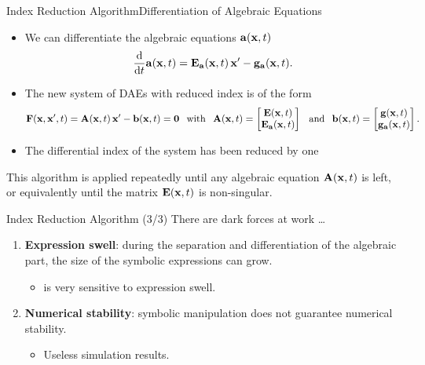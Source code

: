\begin{frame}{Index Reduction Algorithm}{Differentiation of Algebraic Equations}
  \begin{itemize}
    \item We can differentiate the algebraic equations $\mathbf{a}(\mathbf{x}, t)$
    \begin{equation*}
      \dfrac{\mathrm{d}}{\mathrm{d}t} \mathbf{a}(\mathbf{x}, t) = \mathbf{E}_{\mathbf{a}}(\mathbf{x}, t) \, \mathbf{x}^\prime - \mathbf{g}_{\mathbf{a}}(\mathbf{x}, t) \text{.}
    \end{equation*}
    \item The new system of \acp{DAE} with reduced index is of the form
    \begin{align*}
      \mathbf{F}(\mathbf{x}, \mathbf{x}^\prime, t) = \mathbf{A}(\mathbf{x}, t) \, \mathbf{x}^\prime - \mathbf{b}(\mathbf{x}, t) = \mathbf{0}
      \hspace{0.75em} \text{with} \hspace{0.75em}
      \mathbf{A}(\mathbf{x}, t) = \begin{bmatrix} \mathbf{E}(\mathbf{x}, t) \\ \mathbf{E}_{\mathbf{a}}(\mathbf{x}, t) \end{bmatrix}
      \hspace{0.75em} \text{and} \hspace{0.75em}
      \mathbf{b}(\mathbf{x}, t) = \begin{bmatrix} \mathbf{g}(\mathbf{x}, t) \\ \mathbf{g}_{\mathbf{a}}(\mathbf{x}, t) \end{bmatrix} \text{.}
    \end{align*}
    \item The differential index of the system has been reduced by one
  \end{itemize}
  \begin{bbox}
    This algorithm is applied repeatedly until any algebraic equation $\mathbf{A}(\mathbf{x}, t)$ is left, or equivalently until the matrix $\mathbf{E}(\mathbf{x}, t)$ is non-singular.
  \end{bbox}
\end{frame}

\begin{frame}{Index Reduction Algorithm (3/3)}
  There are dark forces at work \dots
  \begin{enumerate}
    \item \textbf{Expression swell}: during the separation and differentiation of the algebraic part, the size of the symbolic expressions can grow.
    \begin{itemize}
      \item \Maple{} is very sensitive to expression swell.
    \end{itemize}
    \item \textbf{Numerical stability}: symbolic manipulation does not guarantee numerical stability.
    \begin{itemize}
      \item Useless simulation results.
    \end{itemize}
    \end{enumerate}
\end{frame}

